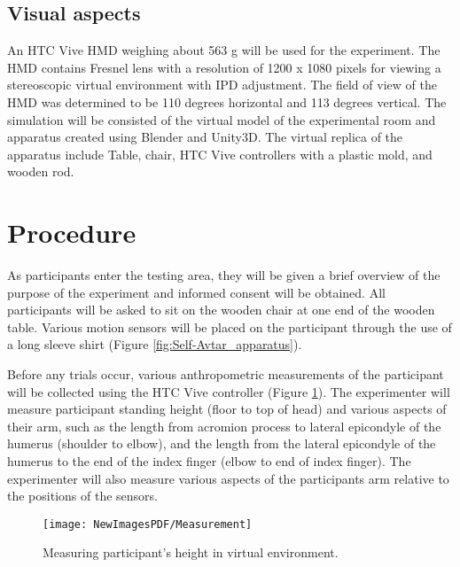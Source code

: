 \subsection{Visual aspects}
An HTC Vive HMD weighing about 563 g will be used for the experiment. The HMD contains Fresnel lens with a resolution of 1200 x 1080 pixels for viewing a stereoscopic virtual environment with IPD adjustment. The field of view of the HMD was determined to be 110 degrees horizontal and 113 degrees vertical. The simulation will be consisted of the virtual model of the experimental room and apparatus created using Blender and Unity3D. The virtual replica of the apparatus include Table, chair, HTC Vive controllers with a plastic mold, and wooden rod. %

\section{Procedure}
As participants enter the testing area, they will be given a brief overview of the purpose of the experiment and informed consent will be obtained. All participants will be asked to sit on the wooden chair at one end of the wooden table. Various motion sensors will be placed on the participant through the use of a long sleeve shirt (Figure \ref{fig:Self-Avtar_apparatus}). 

Before any trials occur, various anthropometric measurements of the participant will be collected using the HTC Vive controller (Figure \ref{fig:measurement}). The experimenter will measure participant standing height (floor to top of head) and various aspects of their arm, such as the length from acromion process to lateral epicondyle of the humerus (shoulder to elbow), and the length from the lateral epicondyle of the humerus to the end of the index finger (elbow to end of index finger). The experimenter will also measure various aspects of the participants arm relative to the positions of the sensors. %

\begin{figure}
	\centering
	\texttt{[image: NewImagesPDF/Measurement]}
	\caption{Measuring participant's height in virtual environment.}
	\label{fig:measurement}
\end{figure}

